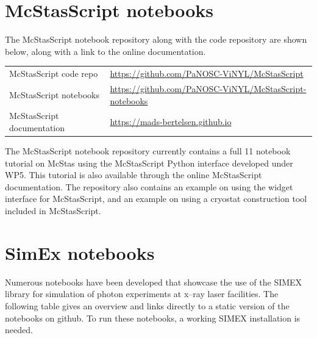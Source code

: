 \documentclass[10pt]{scrartcl}
\begin{document}
\section{McStasScript notebooks}
\label{sec:mcstas}
The McStasScript notebook repository along with the code repository are shown below, along with a link to the online documentation.
\begin{center}
\begin{tabular}{l l}
McStasScript code repo  & \url{https://github.com/PaNOSC-ViNYL/McStasScript} \\ 
McStasScript notebooks & \url{https://github.com/PaNOSC-ViNYL/McStasScript-notebooks} \\  
McStasScript documentation & \url{https://mads-bertelsen.github.io}
\end{tabular}
\end{center}
The McStasScript notebook repository currently contains a full 11 notebook
tutorial on McStas using the McStasScript Python interface developed under WP5.
This tutorial is also available through the online McStasScript documentation.
The repository also contains an example on using the widget interface for
McStasScript, and an example on using a cryostat construction tool included in
McStasScript.

\section{SimEx notebooks}
\label{sec:simex}
Numerous notebooks have been developed that showcase the use of the SIMEX
library for simulation of photon experiments at x--ray laser facilities. The
following table gives an overview and links directly to a static version of the
notebooks on github. 
To run these notebooks, a working SIMEX installation is needed.
\end{document}
